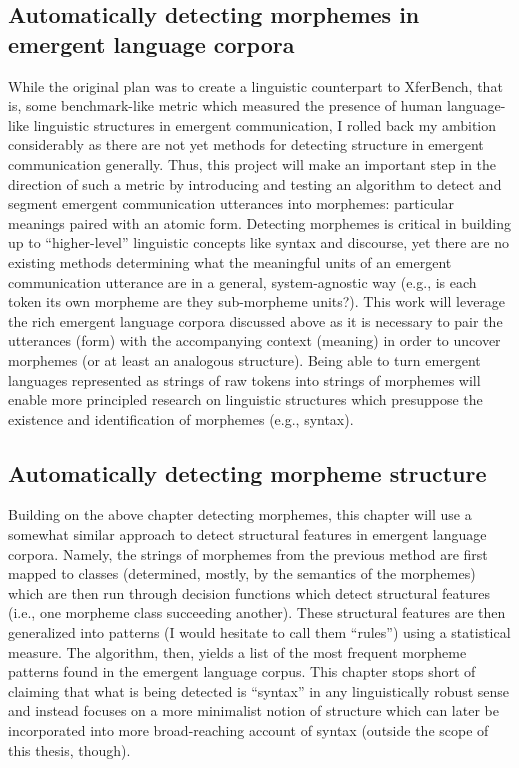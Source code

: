 \subsection{Automatically detecting morphemes in emergent language corpora}
While the original plan was to create a linguistic counterpart to XferBench, that is, some benchmark-like metric which measured the presence of human language-like linguistic structures in emergent communication, I rolled back my ambition considerably as there are not yet methods for detecting structure in emergent communication generally.
Thus, this project will make an important step in the direction of such a metric by introducing and testing an algorithm to detect and segment emergent communication utterances into morphemes: particular meanings paired with an atomic form.
Detecting morphemes is critical in building up to ``higher-level'' linguistic concepts like syntax and discourse, yet there are no existing methods determining what the meaningful units of an emergent communication utterance are in a general, system-agnostic way (e.g., is each token its own morpheme are they sub-morpheme units?).
This work will leverage the rich emergent language corpora discussed above as it is necessary to pair the utterances (form) with the accompanying context (meaning) in order to uncover morphemes (or at least an analogous structure).
Being able to turn emergent languages represented as strings of raw tokens into strings of morphemes will enable more principled research on linguistic structures which presuppose the existence and identification of morphemes (e.g., syntax).



\subsection{Automatically detecting morpheme structure}
Building on the above chapter detecting morphemes, this chapter will use a somewhat similar approach to detect structural features in emergent language corpora.
Namely, the strings of morphemes from the previous method are first mapped to classes (determined, mostly, by the semantics of the morphemes) which are then run through decision functions which detect structural features (i.e., one morpheme class succeeding another).
These structural features are then generalized into patterns (I would hesitate to call them ``rules'') using a statistical measure.
The algorithm, then, yields a list of the most frequent morpheme patterns found in the emergent language corpus.
This chapter stops short of claiming that what is being detected is ``syntax'' in any linguistically robust sense and instead focuses on a more minimalist notion of structure which can later be incorporated into more broad-reaching account of syntax (outside the scope of this thesis, though).

